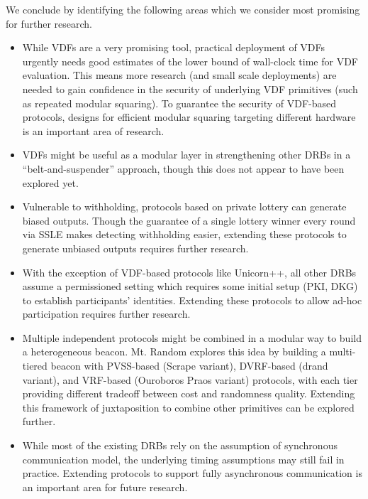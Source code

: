 \documentclass[conference]{IEEEtran}
\theoremstyle{definition}
\theoremstyle{remark}
\begin{document}
We conclude by identifying the following areas which we consider most promising for further research.
\begin{itemize}
    \item While VDFs are a very promising tool, practical deployment of VDFs urgently needs good estimates of the lower bound of wall-clock time for VDF evaluation. This means more research (and small scale deployments) are needed to gain confidence in the security of underlying VDF primitives (such as repeated modular squaring). To guarantee the security of VDF-based protocols, designs for efficient modular squaring targeting different hardware is an important area of research.
    \item VDFs might be useful as a modular layer in strengthening other DRBs in a ``belt-and-suspender'' approach, though this does not appear to have been explored yet.
    \item Vulnerable to withholding, protocols based on private lottery can generate biased outputs. Though the guarantee of a single lottery winner every round via SSLE makes detecting withholding easier, extending these protocols to generate unbiased outputs requires further research.
    \item With the exception of VDF-based protocols like Unicorn++, all other DRBs assume a permissioned setting which requires some initial setup (PKI, DKG) to establish participants' identities. Extending these protocols to allow ad-hoc participation requires further research.
    \item Multiple independent protocols might be combined in a modular way to build a heterogeneous beacon. Mt. Random \cite{cascudomt} explores this idea by building a multi-tiered beacon with PVSS-based (Scrape variant), DVRF-based (drand variant), and VRF-based (Ouroboros Praos variant) protocols, with each tier providing different tradeoff between cost and randomness quality. Extending this framework of juxtaposition to combine other primitives can be explored further.
    \item While most of the existing DRBs rely on the assumption of synchronous communication model, the underlying timing assumptions may still fail in practice. Extending protocols to support fully asynchronous communication is an important area for future research.
\end{itemize}


\appendix
\end{document}
